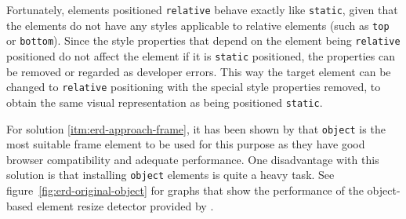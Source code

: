 \documentclass[a4paper,11pt]{kth-mag}
\newcommand{\code}[1]{\texttt{#1}}
\begin{document}
\begin{itemize}
            Fortunately, \glspl{element} positioned \code{relative} behave exactly like \code{static}, given that the \glspl{element} do not have any styles applicable to relative elements (such as \code{top} or \code{bottom}).
            Since the style properties that depend on the \gls{element} being \code{relative} positioned do not affect the \gls{element} if it is \code{static} positioned, the properties can be removed or regarded as developer errors.
            This way the target \gls{element} can be changed to \code{relative} positioning with the special style properties removed, to obtain the same visual representation as being positioned \code{static}.
        \end{itemize}

        For solution \ref{itm:erd-approach-frame}, it has been shown by \cite{backalley} that \code{object} is the most suitable frame \gls{element} to be used for this purpose as they have good \gls{browser} compatibility and adequate performance.
        One disadvantage with this solution is that installing \code{object} elements is quite a heavy task.
        See figure~\ref{fig:erd-original-object} for graphs that show the performance of the object-based element resize detector provided by \cite{backalley}.
\end{document}
